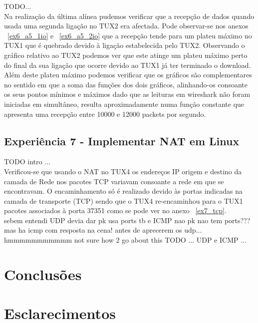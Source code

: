 \documentclass[11pt,a4paper,reqno]{report}
\numberwithin{equation}{section}
\begin{document}
TODO...\\

Na realização da última alínea pudemos verificar que a recepção de dados quando usada uma segunda ligação no TUX2 era afectada. Pode observar-se nos anexos ~\ref{ex6_a5_1io} e ~\ref{ex6_a5_2io} que a recepção  tende para um plateu máximo no TUX1 que é quebrado devido à ligação estabelecida pelo TUX2. Observando o gráfico relativo ao TUX2 podemos ver que este atinge um plateu máximo perto do final da sua ligação que ocorre devido ao TUX1 já ter terminado o download. Além deste plateu máximo podemos verificar que os gráficos são complementares no sentido em que a soma das funções dos dois gráficos, alinhando-os consoante os seus pontos mínimos e máximos dado que as leituras em wireshark não foram iniciadas em simultâneo, resulta aproximadamente numa função constante que apresenta uma recepção entre 10000 e 12000 packets por segundo.

\section{Experiência 7 - Implementar NAT em Linux}

TODO intro ... \\

Verificou-se que usando o NAT no TUX4 os endereços IP origem e destino da camada de Rede nos pacotes TCP variavam consoante a rede em que se encontravam. O encaminhamento só é realizado devido às portas indicadas na camada de transporte (TCP) sendo que o TUX4 re-encaminhou para o TUX1 pacotes associados à porta 37351 como se pode ver no anexo ~\ref{ex7_tcp}.\\

sebem entendi UDP devia dar pk usa ports tb e ICMP nao pk nao tem ports???
mas ha icmp com resposta na cena! antes de aprecerem os udp... hmmmmmmmmmmm
not sure how 2 go about this
TODO ... UDP e ICMP ...\\

\chapter{Conclusões}

\chapter{Esclarecimentos}
\end{document}
